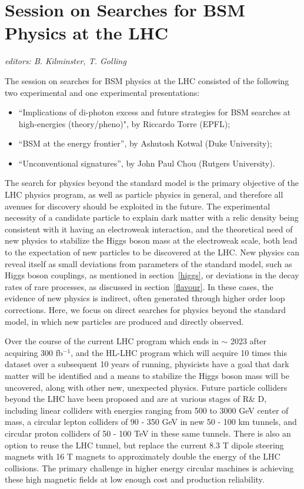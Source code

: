 \section{Session on Searches for BSM Physics at the LHC}\label{lhcbsm}{\it editors: B. Kilminster, T. Golling}

\noindent The session on searches for BSM physics at the LHC consisted of the following two experimental and one experimental presentations:
\begin{itemize} \setlength{\itemsep}{-1ex}
\item ``Implications of di-photon excess and future strategies for BSM searches at high-energies (theory/pheno)", by Riccardo Torre  (EPFL);
\item ``BSM at the energy frontier'', by Ashutosh Kotwal  (Duke University);
\item ``Unconventional signatures'', by John Paul Chou (Rutgers University).
\end{itemize}


\noindent The search for physics beyond the standard model is the primary objective of the LHC physics program, as well as particle physics in general, and therefore all avenues for discovery should be exploited in the future.  The experimental necessity of a candidate particle to explain dark matter with a relic density being consistent with it having an electroweak interaction, and the theoretical need of new physics to stabilize the Higgs boson mass at the electroweak scale, both lead to the expectation of new particles to be discovered at the LHC.    New physics can reveal itself as small deviations from parameters of the standard model, such as Higgs boson couplings, as mentioned in section~\ref{higgs}, or deviations in the decay rates of rare processes, as discussed in section~\ref{flavour}.  In these cases, the evidence of new physics is indirect, often generated through higher order loop corrections.   Here, we focus on direct searches for physics beyond the standard model, in which new particles are produced and directly observed.

\medskip 
\noindent Over the course of the current LHC program which ends in $\sim$ 2023 after acquiring 300 fb$^{-1}$, and the HL-LHC program which will acquire 10 times this dataset over a subsequent 10 years of running, physicists have a goal that dark matter will be identified and a means to stabilize the Higgs boson mass will be uncovered, along with other new, unexpected physics.  Future particle colliders beyond the LHC have been proposed and are at various stages of R\& D, including linear colliders with energies ranging from 500 to 3000 GeV center of mass, a circular lepton colliders of 90 - 350 GeV in new 50 - 100 km tunnels, and circular proton colliders of 50 - 100 TeV in these same tunnels.  There is also an option to reuse the LHC tunnel, but replace the current 8.3 T dipole steering magnets with 16 T magnets to approximately double the energy of the LHC collisions.   The primary challenge in higher energy circular machines is achieving these high magnetic fields at low enough cost and production reliability. 
\medskip 

